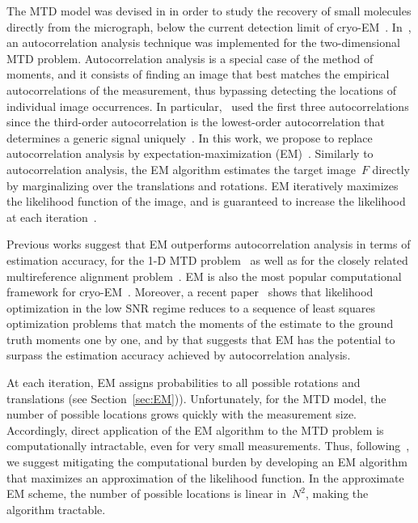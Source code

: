 \documentclass{article}
\begin{document}
The MTD model was devised in \cite{bendory2018toward} in order to study the recovery of small molecules directly from the micrograph, below the current detection limit of \mbox{cryo-EM}~\cite{henderson1995potential, d2021current}. In~\cite{marshall2020image, bendory2021multi, kreymer2021two}, an autocorrelation analysis technique was implemented for the two-dimensional MTD problem. Autocorrelation analysis is a special case of the method of moments, and it consists of finding an image that best matches the empirical autocorrelations of the measurement, thus bypassing detecting the locations of individual image occurrences. In particular,~\cite{marshall2020image, bendory2021multi, kreymer2021two} used the first three autocorrelations since the third-order autocorrelation is the lowest-order autocorrelation that determines a generic signal uniquely~\cite{bendory2019multi}. In this work, we propose to replace autocorrelation analysis by expectation-maximization (EM)~\cite{dempster1977maximum}. Similarly to autocorrelation analysis, the EM algorithm estimates the target image~$F$ directly by marginalizing over the translations and rotations. EM iteratively maximizes the likelihood function of the image, and is guaranteed to increase the likelihood at each iteration~\cite{dempster1977maximum}.

Previous works suggest that EM outperforms autocorrelation analysis in terms of estimation accuracy, for the \mbox{1-D} MTD problem~\cite{lan2020multi} as well as for the closely related multireference alignment problem~\cite{bendory2017bispectrum, abbe2018multireference}. EM is also the most popular computational framework for cryo-EM~\cite{scheres2012relion, punjani2017cryosparc}. Moreover, a recent paper~\cite{katsevich2020likelihood} shows that likelihood optimization in the low SNR regime reduces to a sequence of least squares optimization problems that match the moments of the estimate to the ground truth moments one by one, and by that suggests that EM has the potential to surpass the estimation accuracy achieved by autocorrelation analysis.

At each iteration, EM assigns probabilities to all possible rotations and translations (see Section~\ref{sec:EM})). Unfortunately, for the MTD model, the number of possible locations grows quickly with the measurement size. Accordingly, direct application of the EM algorithm to the MTD problem is computationally intractable, even for very small measurements. Thus, following~\cite{lan2020multi}, we suggest mitigating the computational burden by developing an EM algorithm that maximizes an approximation of the likelihood function. In the approximate EM scheme, the number of possible locations is linear in~$N^2$, making the algorithm tractable.
\end{document}

